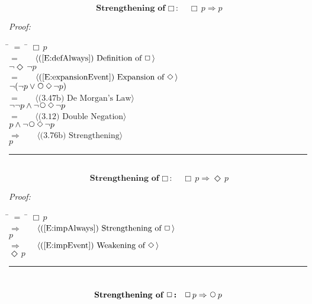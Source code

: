 \documentclass[fleqn, leqno]{article}
\newcommand{\lgap}{2pt}                             %
\newcommand{\mymathindent}{24pt}                    %
\newcommand{\Next}{\;\,\text{\raisebox{3.5pt}{\circle{6}}}}
\newcommand{\Event}{\Diamond\,}
\newcommand{\Always}{\Box\,}
\newcommand{\myqed}{\hfill\rule[-.23ex]{1.2ex}{2.0ex}}
\newcommand{\Gll} {\langle}                         %
\newcommand{\Ggg} {\rangle}                         %
\newcommand{\Hint}[1]     {\ \ \ $\Gll              \mbox{#1} \Ggg$ }   %
\begin{document}
\begin{equation}\label{E:impAlways}
\textbf{Strengthening of $\Always$:}\quad \Always p \Rightarrow p
\end{equation}

\emph{Proof:}
\begin{tabbing}
\hspace{\mymathindent} \= $= \;$ \= \kill
  \> \>   $\Always p$\\[\lgap]
  \> $=$  \>  \Hint{(\ref{E:defAlways}) Definition of $\Always$}\\[\lgap]
  \> \>   $\lnot\Event\lnot p$\\[\lgap]
  \> $=$  \>  \Hint{(\ref{E:expansionEvent}) Expansion of $\Event$}\\[\lgap]
  \> \>   $\lnot(\lnot p \lor \Next\Event\lnot p)$\\[\lgap]
  \> $=$  \>  \Hint{(3.47b) De Morgan's Law}\\[\lgap]
  \> \>   $\lnot\lnot p \land \lnot\Next\Event\lnot p$\\[\lgap]
  \> $=$  \>  \Hint{(3.12) Double Negation}\\[\lgap]
  \> \>   $p \land \lnot\Next\Event\lnot p$\\[\lgap]
  \> $\Rightarrow$  \>  \Hint{(3.76b) Strengthening}\\[\lgap]
  \> \>   $p$\\[\lgap]
\end{tabbing}
\myqed\\[\lgap]


\begin{equation}\label{E:impAlwaysE}
\textbf{Strengthening of $\Always$:}\quad \Always p \Rightarrow \Event p
\end{equation}

\emph{Proof:}
\begin{tabbing}
\hspace{\mymathindent} \= $= \;$ \= \kill
  \> \>   $\Always p$\\[\lgap]
  \> $\Rightarrow$  \>  \Hint{(\ref{E:impAlways}) Strengthening of $\Always$}\\[\lgap]
  \> \>   $p$\\[\lgap]
  \> $\Rightarrow$  \>  \Hint{(\ref{E:impEvent}) Weakening of $\Event$}\\[\lgap]
  \> \>   $\Event p$\\[\lgap]
\end{tabbing}
\myqed\\[\lgap]


\begin{equation}\label{E:impAlwaysN}
\textbf{Strengthening of $\Always$:}\quad \Always p \Rightarrow \Next p
\end{equation}
\end{document}
